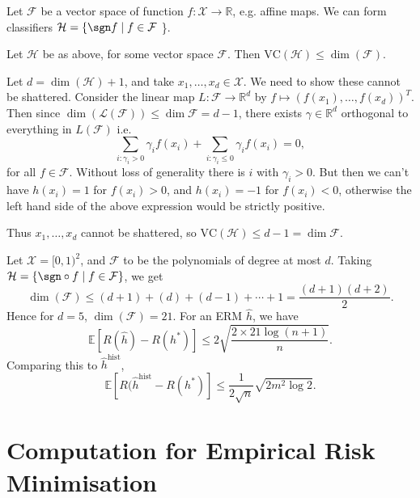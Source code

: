 \documentclass[12pt]{article}
\begin{document}
Let $\mathcal{F}$ be a vector space of function $f : \mathcal{X} \to \mathbb{R}$, e.g. affine maps. We can form classifiers $\mathcal{H}=  \{ \sgn f \mid f \in \mathcal{F}$ \}.

\begin{proposition}
	Let $\mathcal{H}$ be as above, for some vector space $\mathcal{F}$. Then $\mathrm{VC}(\mathcal{H}) \leq \dim (\mathcal{F})$.
\end{proposition}

\begin{proofbox}
	Let $d = \dim (\mathcal{H}) + 1$, and take $x_1, \ldots, x_d \in \mathcal{X}$. We need to show these cannot be shattered. Consider the linear map $L : \mathcal{F} \to \mathbb{R}^d$ by $f \mapsto (f(x_1), \ldots, f(x_d))^T$. Then since $\dim (\mathcal{L}(\mathcal{F})) \leq \dim \mathcal{F} = d-1$, there exists $\gamma \in \mathbb{R}^d$ orthogonal to everything in $L(\mathcal{F})$ i.e.
	\[
	\sum_{i : \gamma_i > 0}\gamma_i f(x_i) + \sum_{i : \gamma_i \leq 0} \gamma_i f(x_i) = 0,
	\]
	for all $f \in \mathcal{F}$. Without loss of generality there is $i$ with $\gamma_i > 0$. But then we can't have $h(x_i) = 1$ for $f(x_i) > 0$, and $h(x_{i}) = -1$ for $f(x_i) < 0$, otherwise the left hand side of the above expression would be strictly positive.

	Thus $x_1, \ldots, x_d$ cannot be shattered, so $\mathrm{VC}(\mathcal{H}) \leq d - 1 = \dim \mathcal{F}$.
\end{proofbox}

\begin{exbox}
	Let $\mathcal{X} = [0, 1)^2$, and $\mathcal{F}$ to be the polynomials of degree at most $d$. Taking $\mathcal{H} = \{ \sgn \circ f \mid f \in \mathcal{F}\}$, we get
	\[
	\dim(\mathcal{F}) \leq (d+1) + (d) + (d-1) + \cdots + 1 = \frac{(d+1)(d+2)}{2}.
	\]
	Hence for $d = 5$, $\dim (\mathcal{F}) = 21$. For an ERM $\hat h$, we have
	\[
		\mathbb{E}[R(\hat h) - R(h^\ast)] \leq 2 \sqrt{\frac{2 \times 21 \log(n+1)}{n}}.
	\]
	Comparing this to $\hat h^{\mathrm{hist}}$,
	\[
		\mathbb{E}[R(\hat h^{\mathrm{hist}} - R(h^\ast)] \leq \frac{1}{2 \sqrt n} \sqrt{2 m^2 \log 2}.
	\]
\end{exbox}


\newpage

\section{Computation for Empirical Risk Minimisation}
\label{sec:comp}
\end{document}
